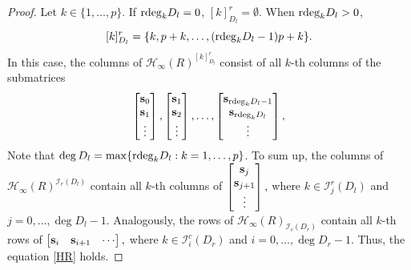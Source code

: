 \documentclass[12pt,reqno]{amsart}
\theoremstyle{plain}
\numberwithin{equation}{section}
\theoremstyle{remark}
\begin{document}
\begin{proof} Let $k\in \{1,\ldots,p\}$. If ${\rm rdeg}_kD_l=0$,  $[k]^r_{D_l}=\emptyset$. When ${\rm rdeg}_kD_l>0$,  $$[k]^r_{D_l}=\{k,p+k,\ldots,({\rm rdeg}_kD_l-1)p+k\}.$$ In this case,
the columns of $\mathscr{H}_{\infty}( R)^{[k]^r_{D_l}}$ consist of all $k$-th columns of the submatrices 
\begin{equation*}
\begin{bmatrix}
{\bf s}_{0}\\
{\bf s}_{1}\\
\vdots
\end{bmatrix},\begin{bmatrix}
{\bf s}_{1}\\
{\bf s}_{2}\\
\vdots
\end{bmatrix},\ldots,\begin{bmatrix}
{\bf s}_{{\rm rdeg}_kD_l-1}\\
{\bf s}_{{\rm rdeg}_kD_l}\\
\vdots
\end{bmatrix},
\end{equation*}
Note that $\deg D_l=\max \{{\rm rdeg}_kD_l:k=1,\ldots,p\}$.
To sum up, the columns of $\mathscr{H}_{\infty}(R)^{\mathcal I_r(D_l)}$ contain all $k$-th columns of 
$
\begin{bmatrix}
{\bf s}_{j}\\
{\bf s}_{j+1}\\
\vdots
\end{bmatrix},
$
where $k\in \mathcal I^r_j(D_l)$ and $j=0,\ldots,\deg D_l-1$. Analogously, the rows of $\mathscr{H}_{\infty}(R)_{\mathcal I_c(D_r)}$ contain all $k$-th rows of 
$
\begin{bmatrix}
{\bf s}_{i} &
{\bf s}_{i+1} &\cdots
\end{bmatrix},
$
where $k\in \mathcal I^c_i(D_r)$ and $i=0,\ldots,\deg D_r-1$. Thus, the equation \eqref{HR} holds.

\end{proof}
\end{document}
